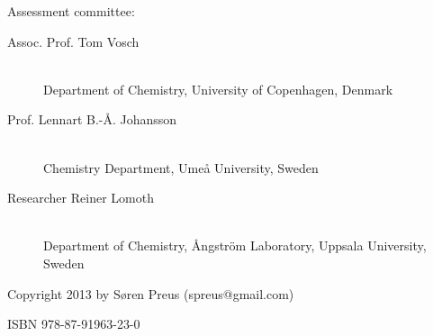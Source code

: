 \begin{vcentrepage}
{ \begin{center}\Large Assessment committee:  \end{center}}
\vspace{1em}
\begin{description}
\item[Assoc. Prof. Tom Vosch] \hfill \\
Department of Chemistry, University of Copenhagen, Denmark
\item[Prof. Lennart B.-Å. Johansson] \hfill \\
Chemistry Department, Umeå University, Sweden
\item[Researcher Reiner Lomoth] \hfill \\
Department of Chemistry, Ångström Laboratory, Uppsala University, Sweden
\end{description}
\pagestyle{plain}

\vspace{7cm}
\noindent Copyright \textcopyright{} 2013 by Søren Preus (spreus@gmail.com)

\vspace{3cm}
\hfill ISBN 978-87-91963-23-0
\end{vcentrepage}
